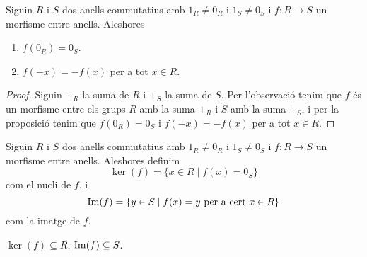 \documentclass[../Apunts.tex]{subfiles}
\begin{document}
	\begin{proposition}
		\label{prop:propietats morfismes entre anells}
			Siguin \(R\) i \(S\) dos anells commutatius amb \(1_{R}\neq0_{R}\) i \(1_{S}\neq0_{S}\) i \(f\colon R\longrightarrow S\) un morfisme entre anells. Aleshores
		\begin{enumerate}
			\item \(f(0_{R})=0_{S}\).
			\item \(f(-x)=-f(x)\) per a tot \(x\in R\).
		\end{enumerate}
		\begin{proof}
			Siguin \(+_{R}\) la suma de \(R\) i \(+_{S}\) la suma de \(S\). Per l'observació  tenim que \(f\) és un morfisme entre els grups \(R\) amb la suma \(+_{R}\) i \(S\) amb la suma \(+_{S}\), i per la proposició  tenim que \(f(0_{R})=0_{S}\) i \(f(-x)=-f(x)\) per a tot \(x\in R\).
		\end{proof}
	\end{proposition}
	\begin{definition}
		\label{def:nucli d'un morfisme entre anells}
		\label{def:imatge d'un morfisme entre anells}
		Siguin \(R\) i \(S\) dos anells commutatius amb \(1_{R}\neq0_{R}\) i \(1_{S}\neq0_{S}\) i \(f\colon R\longrightarrow S\) un morfisme entre anells. Aleshores definim
		\[\ker(f)=\{x\in R\mid f(x)=0_{S}\}\]
		com el nucli de \(f\), i
		\[\operatorname{Im}(f)=\{y\in S\mid f(x)=y\text{ per a cert }x\in R\}\]
		com la imatge de \(f\).
	\end{definition}
	\begin{observation}
		\label{obs:nucli d'un morfisme entre anells es subconjunt del grup d'entrada, imatge n'és del de sortida}
		\(\ker(f)\subseteq R\), \(\operatorname{Im}(f)\subseteq S\).
	\end{observation}
\end{document}
